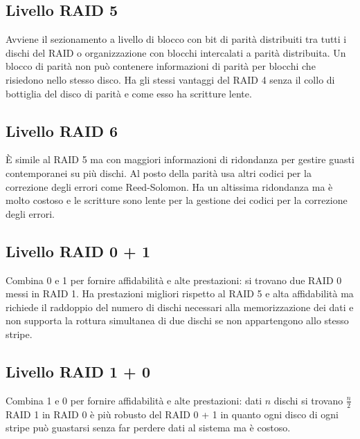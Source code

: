 \subsection{Livello RAID 5}
Avviene il sezionamento a livello di blocco con bit di parit\`a distribuiti tra tutti i dischi del RAID o organizzazione con blocchi intercalati a parit\`a distribuita. Un blocco di 
parit\`a non pu\`o contenere informazioni di parit\`a per blocchi che risiedono nello stesso disco. Ha gli stessi vantaggi del RAID 4 senza il collo di bottiglia del disco di parit\`a
e come esso ha scritture lente. 
\subsection{Livello RAID 6}
\`E simile al RAID 5 ma con maggiori informazioni di ridondanza per gestire guasti contemporanei su pi\`u dischi. Al posto della parit\`a usa altri codici per la correzione degli errori
come Reed-Solomon. Ha un altissima ridondanza ma \`e molto costoso e le scritture sono lente per la gestione dei codici per la correzione degli errori. 
\subsection{Livello RAID 0 + 1}
Combina 0 e 1 per fornire affidabilit\`a e alte prestazioni: si trovano due RAID 0 messi in RAID 1. Ha prestazioni migliori rispetto al RAID 5 e alta affidabilit\`a ma richiede il 
raddoppio del numero di dischi necessari alla memorizzazione dei dati e non supporta la rottura simultanea di due dischi se non appartengono allo stesso stripe. 
\subsection{Livello RAID 1 + 0}
Combina 1 e 0  per fornire affidabilit\`a e alte prestazioni: dati $n$ dischi si trovano $\frac{n}{2}$ RAID 1 in RAID 0 \`e pi\`u robusto del RAID 0 + 1 in quanto ogni disco di ogni 
stripe pu\`o guastarsi senza far perdere dati al sistema ma \`e costoso. 
